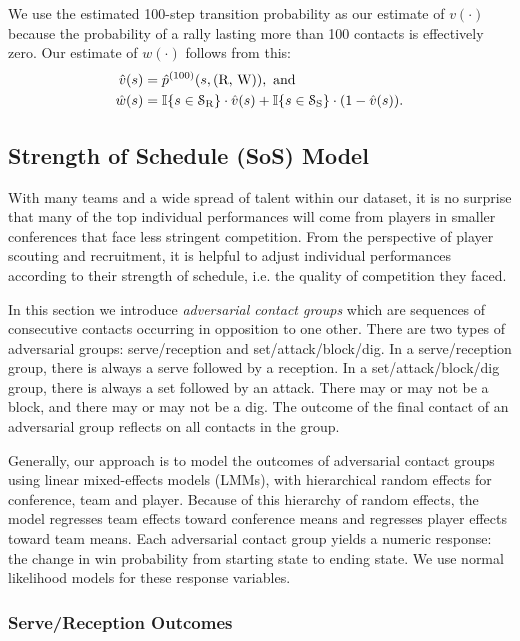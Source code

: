 \documentclass[USenglish]{article}
\theoremstyle{dgthm}
\theoremstyle{dgdef}
\begin{document}
We use the estimated 100-step transition probability as our estimate of $v(\cdot)$ because the probability of a rally lasting more than 100 contacts is effectively zero. Our estimate of $w(\cdot)$ follows from this:
\begin{align*}
  \hat v(s) &= \hat p^{(100)}(s, \mbox{(R, W)}),\mbox{ and}\\
  \hat w(s) &= \mathbb{I}\{s \in \mathcal{S}_{\mbox{\scriptsize R}}\} \cdot \hat v(s) + \mathbb{I}\{s \in \mathcal{S}_{\mbox{\scriptsize S}}\} \cdot (1 - \hat v(s)).
\end{align*}

\subsection{Strength of Schedule (SoS) Model}
\label{sec:strength-of-schedule}

With many teams and a wide spread of talent within our dataset, it is no surprise that many of the top individual performances will come from players in smaller conferences that face less stringent competition. From the perspective of player scouting and recruitment, it is helpful to adjust individual performances according to their strength of schedule, i.e. the quality of competition they faced.

In this section we introduce {\it adversarial contact groups} which are sequences of consecutive contacts occurring in opposition to one other. There are two types of adversarial groups: serve/reception and set/attack/block/dig. In a serve/reception group, there is always a serve followed by a reception. In a set/attack/block/dig group, there is always a set followed by an attack. There may or may not be a block, and there may or may not be a dig. The outcome of the final contact of an adversarial group reflects on all contacts in the group.

Generally, our approach is to model the outcomes of adversarial contact groups using linear mixed-effects models (LMMs), with hierarchical random effects for conference, team and player. Because of this hierarchy of random effects, the model regresses team effects toward conference means and regresses player effects toward team means. Each adversarial contact group yields a numeric response: the change in win probability from starting state to ending state. We use normal likelihood models for these response variables.

\subsubsection{Serve/Reception Outcomes}
\label{sec:sos-serve}
\end{document}
